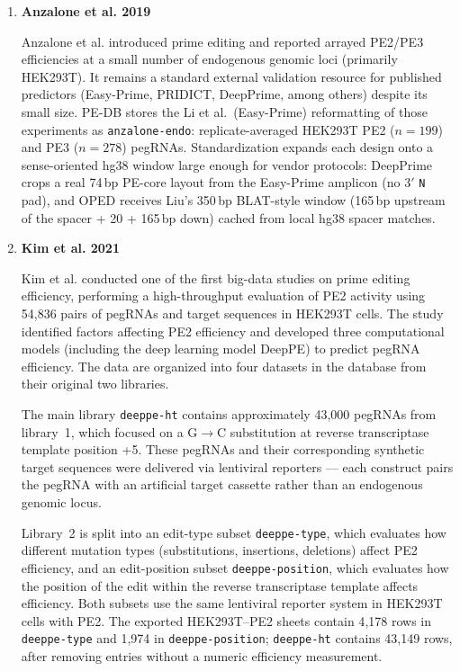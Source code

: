 \documentclass{article}
\begin{document}
\begin{enumerate}
    \item \textbf{Anzalone et al. 2019}

    Anzalone et al.\cite{anzaloneSearchandreplaceGenomeEditing2019} introduced prime editing and reported arrayed PE2/PE3 efficiencies at a small number of endogenous genomic loci (primarily HEK293T). It remains a standard external validation resource for published predictors (Easy-Prime, PRIDICT, DeepPrime, among others) despite its small size. PE-DB stores the Li et al.\ (Easy-Prime) reformatting of those experiments as \nolinkurl{anzalone-endo}: replicate-averaged HEK293T PE2 ($n = 199$) and PE3 ($n = 278$) pegRNAs. Standardization expands each design onto a sense-oriented hg38 window large enough for vendor protocols: DeepPrime crops a real 74\,bp PE-core layout from the Easy-Prime amplicon (no 3$'$ \texttt{N} pad), and OPED receives Liu's 350\,bp BLAT-style window (165\,bp upstream of the spacer + 20 + 165\,bp down) cached from local hg38 spacer matches.

    \item \textbf{Kim et al. 2021}

    Kim et al.\cite{kimPredictingEfficiencyPrime2021} conducted one of the first big-data studies on prime editing efficiency, performing a high-throughput evaluation of PE2 activity using 54,836 pairs of pegRNAs and target sequences in HEK293T cells. The study identified factors affecting PE2 efficiency and developed three computational models (including the deep learning model DeepPE) to predict pegRNA efficiency. The data are organized into four datasets in the database from their original two libraries.

    The main library \nolinkurl{deeppe-ht} contains approximately 43,000 pegRNAs from  library~1, which focused on a G$\to$C substitution at reverse transcriptase template position +5. These pegRNAs and their corresponding synthetic target sequences were delivered via lentiviral reporters --- each construct pairs the pegRNA with an artificial target cassette rather than an endogenous genomic locus.

    Library~2 is split into an edit-type subset \nolinkurl{deeppe-type}, which evaluates how different mutation types (substitutions, insertions, deletions) affect PE2 efficiency, and an edit-position subset \nolinkurl{deeppe-position}, which evaluates how the position of the edit within the reverse transcriptase template affects efficiency. Both subsets use the same lentiviral reporter system in HEK293T cells with PE2.
    The exported HEK293T--PE2 sheets contain 4{,}178 rows in \nolinkurl{deeppe-type} and 1{,}974 in \nolinkurl{deeppe-position}; \nolinkurl{deeppe-ht} contains 43{,}149 rows, after removing entries without a numeric efficiency measurement.


\end{enumerate}
\end{document}
